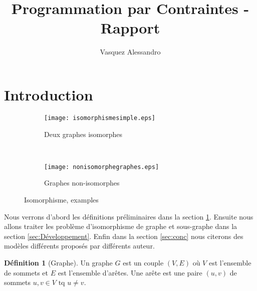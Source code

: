 \documentclass[french]{article}
\theoremstyle{definition}
\newtheorem{deff}{D\'efinition}[section]
\theoremstyle{remark}
\begin{document}
	\title{Programmation par Contraintes - Rapport}
	\author{Vasquez Alessandro}
	\maketitle
	\newpage
	\tableofcontents
	\newpage
\section{Introduction}
\label{sec:intro}
\begin{figure*}[t!]
	\begin{subfigure}[t]{0.5\textwidth}
		\centering
		\texttt{[image: isomorphismesimple.eps]}
		\caption{\label{fig:isographstar}Deux graphes isomorphes}
	\end{subfigure}%
	~ 
	\begin{subfigure}[t]{0.5\textwidth}
		\centering
		\texttt{[image: nonisomorphegraphes.eps]}
		\caption{\label{fig:nonisograph}Graphes  non-isomorphes}
	\end{subfigure}
	\caption{Isomorphisme, examples}
\end{figure*}

Nous verrons d'abord les définitions préliminaires dans la section \ref{sec:intro}. Ensuite nous allons traiter les problème d'isomorphisme de graphe et sous-graphe dans la section \ref{sec:Développement}. 
Enfin dans la section \ref{sec:conc} nous citerons des modèles différents proposés par différents auteur. 

\begin{deff}[Graphe]
	Un graphe $G$ est un couple $(V,E)$ où $V$ est l'ensemble de sommets et $E$ est l'ensemble d'arêtes. Une arête est une paire $(u,v)$ de sommets $u,v \in V \text{ tq } u \neq v.$
	
\end{deff}
\end{document}
